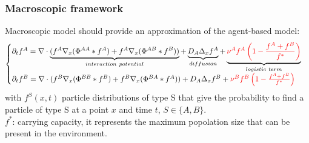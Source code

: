 \documentclass[10pt]{beamer}
\def \p {{\partial}}
\newcommand\Fontvii{\fontsize{9}{7.2}\selectfont}
\begin{document}
\begin{frame}
\frametitle{Macroscopic framework}
\Fontvii
Macroscopic model should provide an approximation of the agent-based model:
	\begin{equation}
\begin{cases}
\p_t f^{A}=  \nabla \cdot \underbrace{(f^A\nabla_x(\Phi^{AA}* f^A) + f^A \nabla_x( \Phi^{AB}*f^B))}_{interaction \ potential} + \underbrace{ D_A \Delta_x f^A}_{diffusion} + \underbrace{ \textcolor{red}{\nu^{A}f^A\left( 1-\frac{f^A+f^B}{f^{*}} \right)}}_{logistic \ term} \\

\p_t f^{B}=  \nabla \cdot (f^B\nabla_x(\Phi^{BB}* f^B) + f^B \nabla_x (\Phi^{BA}*f^A)) + D_A \Delta_x f^B + \textcolor{red}{\nu^{B}f^B\left( 1-\frac{f^A+f^B}{f^{*}} \right)}
\end{cases}
\end{equation}
with  $f^{S}(x,t)$ particle distributions of type S that give the probability to find a particle of type S at a point $x$ and time $t$, $S \in \{ A,B \}$. \\
 $f^*$: carrying capacity, it represents the maximum popolation size that can be present in the environment.

\end{frame}
\end{document}
